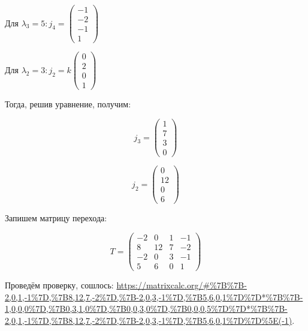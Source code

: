 \documentclass[12pt, a4paper]{article}
\begin{document}
    Для $\lambda_3 = 5: j_4 = \begin{pmatrix}
        -1 \\ -2 \\ -1 \\ 1
    \end{pmatrix}$


    Для $\lambda_2 = 3: j_2 = k\begin{pmatrix}
        0 \\ 2 \\ 0 \\ 1
    \end{pmatrix}$

    Тогда, решив уравнение, получим:

    \begin{equation}
        j_3 = \begin{pmatrix}
            1 \\ 7 \\ 3 \\ 0
        \end{pmatrix}
    \end{equation}

    \begin{equation}
        j_2 = \begin{pmatrix}
            0 \\ 12 \\ 0 \\ 6
        \end{pmatrix}
    \end{equation}

    Запишем матрицу перехода:

    \begin{equation}
        T = \left(\begin{matrix}
            -2 & 0 & 1 & -1 \\
            8 & 12 & 7 & -2 \\
            -2 & 0 & 3 & -1 \\
            5 & 6 & 0 & 1
        \end{matrix}\right)
    \end{equation}

    Проведём проверку, сошлось: \url{https://matrixcalc.org/#%7B%7B-2,0,1,-1%7D,%7B8,12,7,-2%7D,%7B-2,0,3,-1%7D,%7B5,6,0,1%7D%7D*%7B%7B-1,0,0,0%7D,%7B0,3,1,0%7D,%7B0,0,3,0%7D,%7B0,0,0,5%7D%7D*%7B%7B-2,0,1,-1%7D,%7B8,12,7,-2%7D,%7B-2,0,3,-1%7D,%7B5,6,0,1%7D%7D%5E(-1)}.
\end{document}
